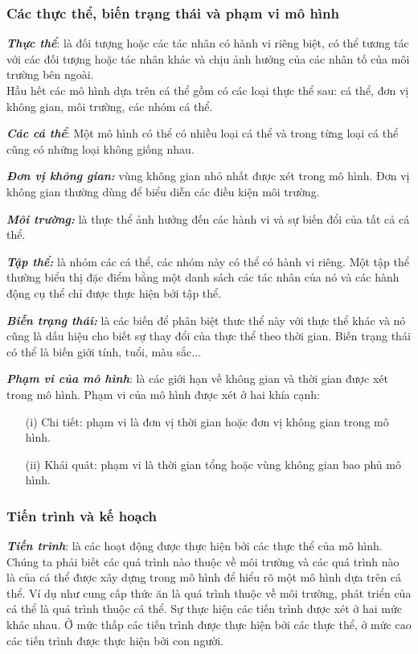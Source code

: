 \documentclass[13pt]{extreport}
\begin{document}
\subsubsection{Các thực thể, biến trạng thái và phạm vi mô hình}
\textit{\textbf{\indent Thực thể}}: là đối tượng hoặc các tác nhân có hành vi riêng biệt, có thể tương tác với các đối tượng hoặc tác nhân khác và chịu ảnh hưởng của các nhân tố của môi trường bên ngoài.\\
Hầu hết các mô hình dựa trên cá thể gồm có các loại thực thể sau: cá thể, đơn vị không gian, môi trường, các nhóm cá thể.

\textit{\textbf{Các cá thể}}: Một mô hình có thể có nhiều loại cá thể và trong từng loại cá thể  cũng có những loại không giống nhau.

\textit{\textbf{Đơn vị không gian:}} vùng không gian nhỏ nhất được xét trong mô hình. Đơn vị không gian thường dùng để biểu diễn các điều kiện môi trường.

\textit{\textbf{Môi trường:}} là thực thể ảnh hưởng đến các hành vi và sự biến đổi của tất cả cá thể.

\textit{\textbf{Tập thể:}} là nhóm các cá thể, các nhóm này có thể có hành vi riêng. Một tập thể thường biểu thị đặc điểm bằng một danh sách các tác nhân của nó và các hành động cụ thể chỉ được thực hiện bởi tập thể.

\textit{\textbf{Biến trạng thái:}} là các biến để phân biệt thưc thể này với thực thể khác và nó cũng là dấu hiệu cho biết sự thay đổi của thực thể theo thời gian. Biến trạng thái có thể là biến giới tính, tuổi, màu sắc...

\textit{\textbf{Phạm vi của mô hình}}: là các giới hạn về không gian và thời gian được xét trong mô hình. Phạm vi của mô hình được xét ở hai khía cạnh:
\begin{itemize}
\item[(i)]Chi tiết: phạm vi là đơn vị thời gian hoặc đơn vị không gian trong mô hình.
\item[(ii)]Khái quát: phạm vi là thời gian tổng hoặc vùng không gian bao phủ mô hình.
\end{itemize}
\subsubsection{Tiến trình và kế hoạch}

\textit{\textbf{\indent Tiến trình}}: là các hoạt động được thực hiện bởi các thực thể của mô hình. Chúng ta phải biết các quá trình nào thuộc về môi trường và các quá trình nào là của cá thể được xây dựng trong mô hình để hiểu rõ một mô hình dựa trên cá thể. Ví dụ như cung cấp thức ăn là quá trình thuộc về môi trường, phát triển của cá thể là quá trình thuộc cá thể. Sự thực hiện các tiến trình được xét ở hai mức khác nhau. Ở mức thấp các tiến trình được thực hiện bởi các thực thể, ở mức cao các tiến trình được thực hiện bởi con người.
\end{document}
